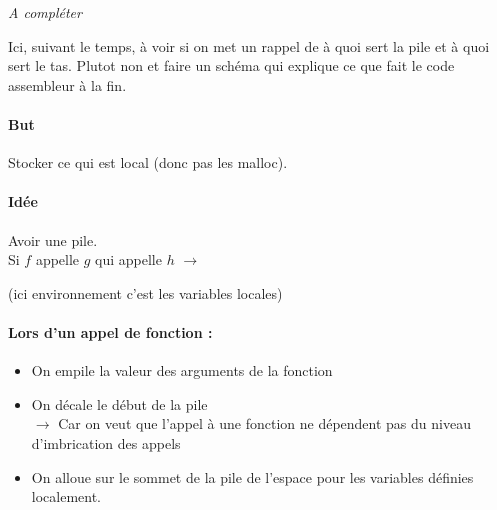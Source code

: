 
\textit{A compléter}

\begin{com}
	Ici, suivant le temps, à voir si on met un rappel de à quoi sert la pile et à quoi sert le tas.
	Plutot non et faire un schéma qui explique ce que fait le code assembleur à la fin.
\end{com}


\paragraph{But} Stocker ce qui est local (donc pas les malloc).

\paragraph{Idée} Avoir une pile.\\
Si $f$ appelle $g$ qui appelle $h$ $\to$ 
\begin{minipage}{0.3\linewidth}
	(ici environnement c'est les variables locales)
\end{minipage}

\paragraph{Lors d'un appel de fonction :}
\begin{itemize}[label=$\star$]
	\item On empile la valeur des arguments de la fonction
	\item On décale le début de la pile\\
	$\rightarrow$ Car on veut que l'appel à une fonction ne dépendent pas du niveau d'imbrication des appels
	\item On alloue sur le sommet de la pile de l'espace pour les variables définies localement.
\end{itemize}

